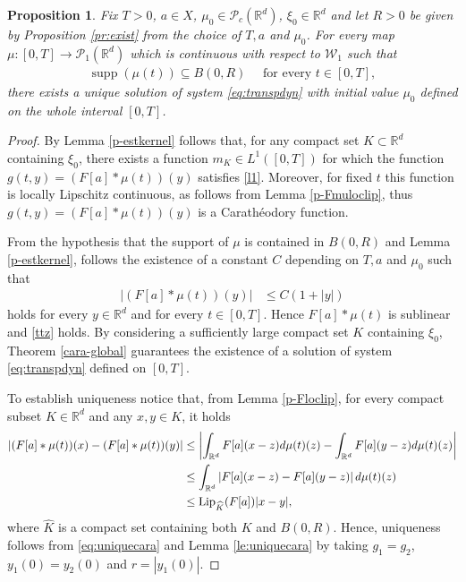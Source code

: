 \documentclass[A4paper,11pt]{article}
\newtheorem{proposition}[theorem]{Proposition}
\theoremstyle{definition}
\newcommand{\Lip}{\textup{Lip}}
\newcommand{\loc}{\textup{loc}}
\newcommand{\R}{\mathbb{R}}
\newcommand{\W}{\mathcal{W}}
\newcommand{\PP}{\mathcal{P}_1}
\DeclareMathOperator{\supp}{supp}
\begin{document}
\begin{proposition}
Fix $T > 0$, $a \in X$, $\mu_0 \in \mathcal{P}_c(\R^d)$, $\xi_0 \in \R^d$ and let $R > 0$ be given by Proposition \ref{pr:exist} from the choice of $T, a$ and $\mu_0$. For every map $\mu:[0,T] \rightarrow \PP(\R^d)$ which is continuous with respect to $\W_1$ such that
\begin{align*}
\supp(\mu(t)) \subseteq B(0,R) \quad \text{ for every } t \in [0,T],
\end{align*}
there exists a unique solution of system \eqref{eq:transpdyn} with initial value $\mu_0$ defined on the whole interval $[0,T]$.
\end{proposition}
\begin{proof}
By Lemma \ref{p-estkernel} follows that, for any compact set $K \subset \R^d$ containing $\xi_0$, there exists a function $m_K \in L^1([0,T])$ for which the function $g(t,y)=(F[a]\ast\mu(t))(y)$ satisfies \eqref{l1}. Moreover, for fixed $t$ this function is locally Lipschitz continuous, as follows from Lemma \ref{p-Fmuloclip}, thus $g(t,y)=(F[a]\ast\mu(t))(y)$ is a Carath\'eodory function.

		
From the hypothesis that the support of $\mu$ is contained in $B(0,R)$ and Lemma \ref{p-estkernel}, follows the existence of a constant $C$ depending on $T,a$ and $\mu_0$ such that
\begin{align*}
|(F[a]*\mu(t))(y)| &\leq C(1+|y|)
\end{align*}
holds for every $y \in \R^d$ and for every $t \in [0,T]$. Hence $F[a]*\mu(t)$ is sublinear and \eqref{ttz} holds. By considering a sufficiently large compact set $K$ containing $\xi_0$, Theorem \ref{cara-global} guarantees the existence of a solution of system \eqref{eq:transpdyn} defined on $[0,T]$.

To establish uniqueness notice that, from Lemma \ref{p-Floclip}, for every compact subset $K \in \R^d$ and any $x,y \in K$, it holds
\begin{align}
\begin{split}\label{eq:uniquecara}
|(F[a]*\mu(t))(x) - (F[a]*\mu(t))(y)| &\leq \left| \int_{\R^d}F[a](x-z)d\mu(t)(z) - \int_{\R^d}F[a](y-z)d\mu(t)(z)\right| \\
&\leq \int_{\R^d} \left|F[a](x-z) - F[a](y-z)\right|d\mu(t)(z) \\
&\leq \Lip_{\widehat{K}}(F[a]) |x-y|,
\end{split}\end{align}
where $\widehat{K}$ is a compact set containing both $K$ and $B(0,R)$. Hence, uniqueness follows from \eqref{eq:uniquecara} and Lemma \ref{le:uniquecara} by taking $g_1 = g_2$, $y_1(0) = y_2(0)$ and $r = |y_1(0)|$.
\end{proof}
\end{document}
